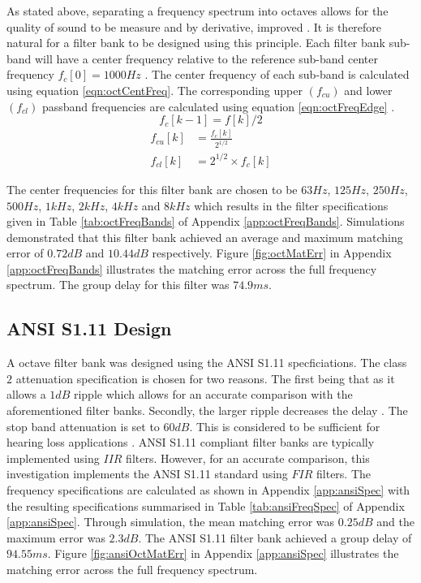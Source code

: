 \documentclass[12pt, onecolumn]{article}
\begin{document}
\noindent As stated above, separating a frequency spectrum into octaves allows for the quality of sound to be measure and by derivative, improved \cite{octave}. It is therefore natural for a filter bank to be designed using this principle. Each filter bank sub-band will have a center frequency relative to the reference sub-band center frequency $f_c [0] = 1000Hz$ \cite{octFreqCalc}. The center frequency of each sub-band is calculated using equation \ref{eqn:octCentFreq}. The corresponding upper $(f_{cu})$ and lower $(f_{cl})$ passband frequencies are calculated using equation \ref{eqn:octFreqEdge} \cite{octFreqCalc}.
%
\begin{equation}
\label{eqn:octCentFreq}
f_c[k-1] = f[k]/2 
\end{equation}
\begin{equation}
\begin{aligned}
\label{eqn:octFreqEdge}
f_{cu}[k] &= \frac{f_c[k] }{2^{1/2}}\\
f_{cl}[k] &= 2^{1/2}\times f_c[k]
\end{aligned}
\end{equation}
%

\noindent The center frequencies for this filter bank are chosen to be $63Hz$, $125Hz$, $250Hz$, $500Hz$, $1kHz$, $2kHz$, $4kHz$ and $8kHz$ which results in the filter specifications given in Table \ref{tab:octFreqBands} of Appendix \ref{app:octFreqBands}. Simulations demonstrated that this filter bank achieved an average and maximum matching error of $0.72dB$ and $10.44dB$ respectively. Figure \ref{fig:octMatErr} in Appendix \ref{app:octFreqBands} illustrates the matching error across the full frequency spectrum. The group delay for this filter was $74.9ms$.

\subsection{ANSI S1.11 Design}
\label{sec:ansi}

\noindent A octave filter bank was designed using the ANSI S1.11 specficiations. The class $2$ attenuation specification is chosen for two reasons. The first being that as it allows a $1dB$ ripple which allows for an accurate comparison with the aforementioned filter banks. Secondly, the larger ripple decreases the delay \cite{yang}. The stop band attenuation is set to $60dB$. This is considered to be sufficient for hearing loss applications \cite{ansiAtten}. ANSI S1.11 compliant filter banks are typically implemented using $IIR$ filters. However, for an accurate comparison, this investigation implements the ANSI S1.11 standard using $FIR$ filters. The frequency specifications are calculated as shown in Appendix \ref{app:ansiSpec} with the resulting specifications summarised in Table \ref{tab:ansiFreqSpec} of Appendix \ref{app:ansiSpec}. Through simulation, the mean matching error was $0.25dB$ and the maximum error was $2.3dB$. The ANSI S1.11 filter bank achieved a group delay of $94.55ms$. Figure \ref{fig:ansiOctMatErr} in Appendix \ref{app:ansiSpec} illustrates the matching error across the full frequency spectrum.
\end{document}
